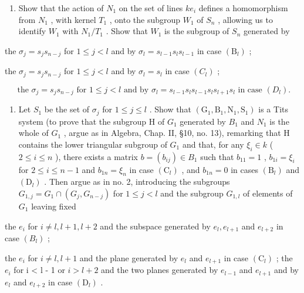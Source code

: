 \begin{enumerate}
\def\labelenumi{\alph{enumi})}
\tightlist
\item
  Show that the action of \(N_{1}\) on the set of lines \(ke_{i}\) defines a homomorphism from \(N_{1}\) , with kernel \(T_{1}\) , onto the subgroup \(W_{1}\) of \(S_{n}\) , allowing us to identify \(W_{1}\) with \(N_{1}/T_{1}\) . Show that \(W_{1}\) is the subgroup of \(S_{n}\) generated by
\end{enumerate}

the \(\sigma_{j} = s_{j}s_{n - j}\) for \(1\leqslant j <   l\) and by \(\sigma_l = s_{l - 1}s_ls_{l - 1}\) in case \((\mathrm{B}_l)\) ;

the \(\sigma_{j} = s_{j}s_{n - j}\) for \(1\leqslant j <   l\) and by \(\sigma_l = s_l\) in case \((C_l)\) ;

\[
\text { the } \sigma_ {j} = s _ {j} s _ {n - j} \text { for } 1 \leqslant j <   l \text { and by } \sigma_ {l} = s _ {l - 1} s _ {l} s _ {l - 1} s _ {l} s _ {l + 1} s _ {l} \text { in case } (D _ {l}).
\]

\begin{enumerate}
\def\labelenumi{\alph{enumi})}
\setcounter{enumi}{1}
\tightlist
\item
  Let \(S_{1}\) be the set of \(\sigma_{j}\) for \(1 \leqslant j \leqslant l\) . Show that \((\mathrm{G}_{1}, \mathrm{B}_{1}, \mathrm{N}_{1}, \mathrm{S}_{1})\) is a Tits system (to prove that the subgroup H of \(G_{1}\) generated by \(B_{1}\) and \(N_{1}\) is the whole of \(G_{1}\) , argue as in Algebra, Chap. II, §10, no. 13), remarking that H contains the lower triangular subgroup of \(G_{1}\) and that, for any \(\xi_{i} \in k\) ( \(2 \leqslant i \leqslant n\) ), there exists a matrix \(b = (b_{ij}) \in B_{1}\) such that \(b_{11} = 1\) , \(b_{1i} = \xi_{i}\) for \(2 \leqslant i \leqslant n - 1\) and \(b_{1n} = \xi_{n}\) in case \((\mathrm{C}_{l})\) , and \(b_{1n} = 0\) in cases \((\mathrm{B}_{l})\) and \((\mathrm{D}_{l})\) . Then argue as in no. 2, introducing the subgroups \(G_{1,j} = G_{1} \cap (G_{j}, G_{n-j})\) for \(1 \leqslant j < l\) and the subgroup \(G_{1,l}\) of elements of \(G_{1}\) leaving fixed
\end{enumerate}

the \(e_i\) for \(i \neq l, l + 1, l + 2\) and the subspace generated by \(e_l, e_{l+1}\) and \(e_{l+2}\) in case \((B_l)\) ;

the \(e_{i}\) for \(i \neq l, l + 1\) and the plane generated by \(e_{l}\) and \(e_{l+1}\) in case \((\mathrm{C}_{l})\) ; the \(e_{i}\) for i \textless{} l - 1 or \(i > l + 2\) and the two planes generated by \(e_{l-1}\) and \(e_{l+1}\) and by \(e_{l}\) and \(e_{l+2}\) in case \((\mathrm{D}_{l})\) .

